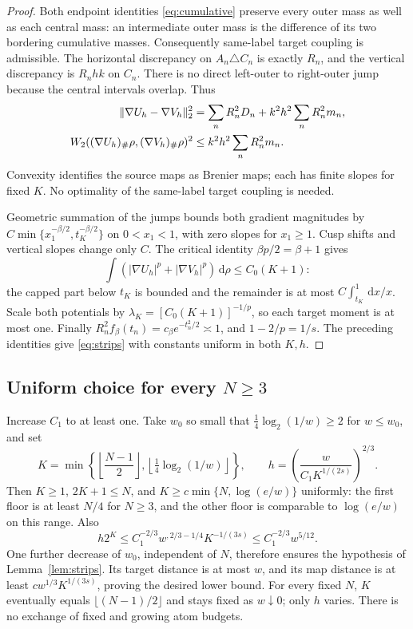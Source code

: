 \documentclass[11pt]{article}
\theoremstyle{remark}\newtheorem{remark}[theorem]{Remark}
\newcommand{\dd}{\,\mathrm d}\newcommand{\Ptwo}{\mathcal P_2}
\begin{document}
\begin{proof}
Both endpoint identities \eqref{eq:cumulative} preserve every outer mass as well as each central mass: an intermediate outer mass is the difference of its two bordering cumulative masses. Consequently same-label target coupling is admissible. The horizontal discrepancy on $A_n\triangle C_n$ is exactly $R_n$, and the vertical discrepancy is $R_nhk$ on $C_n$. There is no direct left-outer to right-outer jump because the central intervals overlap. Thus
\begin{align*}
 \lVert\nabla U_h-\nabla V_h\rVert_2^2
   &=\sum_nR_n^2D_n+k^2h^2\sum_nR_n^2m_n,\\
 W_2((\nabla U_h)_\#\rho,(\nabla V_h)_\#\rho)^2
   &\le k^2h^2\sum_nR_n^2m_n.
\end{align*}
Convexity identifies the source maps as Brenier maps; each has finite slopes for fixed $K$. No optimality of the same-label target coupling is needed.

Geometric summation of the jumps bounds both gradient magnitudes by
$C\min\{x_1^{-\beta/2},t_K^{-\beta/2}\}$ on $0<x_1<1$, with zero slopes for $x_1\ge1$. Cusp shifts and vertical slopes change only $C$. The critical identity $\beta p/2=\beta+1$ gives
\[
 \int(|\nabla U_h|^p+|\nabla V_h|^p)\dd\rho\le C_0(K+1):
\]
the capped part below $t_K$ is bounded and the remainder is at most
$C\int_{t_K}^1\dd x/x$. Scale both potentials by
$\lambda_K=[C_0(K+1)]^{-1/p}$, so each target moment is at most one.
Finally $R_n^2 f_\beta(t_n)=c_\beta e^{-t_n^2/2}\asymp1$, and $1-2/p=1/s$. The preceding identities give \eqref{eq:strips} with constants uniform in both $K,h$.
\end{proof}

\subsection{Uniform choice for every $N\ge3$}
Increase $C_1$ to at least one. Take $w_0$ so small that
$\frac14\log_2(1/w)\ge2$ for $w\le w_0$, and set
\[
 K=\min\left\{\left\lfloor\frac{N-1}{2}\right\rfloor,
                  \left\lfloor\tfrac14\log_2(1/w)\right\rfloor\right\},
 \qquad h=\left(\frac{w}{C_1K^{1/(2s)}}\right)^{2/3}.
\]
Then $K\ge1$, $2K+1\le N$, and
$K\ge c\min\{N,\log(e/w)\}$ uniformly: the first floor is at least $N/4$ for $N\ge3$, and the other floor is comparable to $\log(e/w)$ on this range. Also
\[
 h2^K\le C_1^{-2/3}w^{,2/3-1/4}K^{-1/(3s)}
           \le C_1^{-2/3}w^{5/12}.
\]
One further decrease of $w_0$, independent of $N$, therefore ensures the hypothesis of Lemma~\ref{lem:strips}. Its target distance is at most $w$, and its map distance is at least
$c w^{1/3}K^{1/(3s)}$, proving the desired lower bound. For every fixed $N$, $K$ eventually equals $\lfloor(N-1)/2\rfloor$ and stays fixed as $w\downarrow0$; only $h$ varies. There is no exchange of fixed and growing atom budgets.
\end{document}
